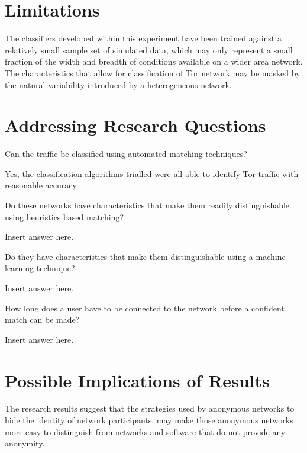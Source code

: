 \section{Limitations}

The classifiers developed within this experiment have been trained against
a relatively small sample set of simulated data, which may only represent
a small fraction of the width and breadth of conditions available on a wider
area network. The characteristics that allow for classification of Tor network
may be masked by the natural variability introduced by a heterogeneous network.

\section{Addressing Research Questions}

\begin{enumerate*}
  \item{Can the traffic be classified using automated matching techniques?}

  Yes, the classification algorithms trialled were all able to identify Tor traffic
  with reasonable accuracy.

  \item{Do these networks have characteristics that make them readily
  distinguishable using heuristics based matching?}

  Insert answer here.

  \item{Do they have characteristics that make them distinguishable using a
  machine learning technique?}

  Insert answer here.

  \item{How long does a user have to be connected to the network before a
  confident match can be made?}

  Insert answer here.

\end{enumerate*}


\section{Possible Implications of Results}

The research results suggest that the strategies used by anonymous networks to
hide the identity of network participants, may make those anonymous networks
more easy to distinguish from networks and software that do not provide any
anonymity.

